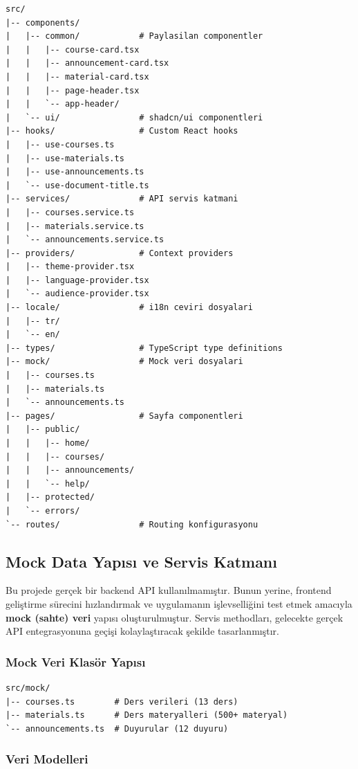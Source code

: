 \documentclass[12pt,a4paper]{article}
\begin{document}
\begin{lstlisting}[basicstyle=\ttfamily\small]
src/
|-- components/
|   |-- common/            # Paylasilan componentler
|   |   |-- course-card.tsx
|   |   |-- announcement-card.tsx
|   |   |-- material-card.tsx
|   |   |-- page-header.tsx
|   |   `-- app-header/
|   `-- ui/                # shadcn/ui componentleri
|-- hooks/                 # Custom React hooks
|   |-- use-courses.ts
|   |-- use-materials.ts
|   |-- use-announcements.ts
|   `-- use-document-title.ts
|-- services/              # API servis katmani
|   |-- courses.service.ts
|   |-- materials.service.ts
|   `-- announcements.service.ts
|-- providers/             # Context providers
|   |-- theme-provider.tsx
|   |-- language-provider.tsx
|   `-- audience-provider.tsx
|-- locale/                # i18n ceviri dosyalari
|   |-- tr/
|   `-- en/
|-- types/                 # TypeScript type definitions
|-- mock/                  # Mock veri dosyalari
|   |-- courses.ts
|   |-- materials.ts
|   `-- announcements.ts
|-- pages/                 # Sayfa componentleri
|   |-- public/
|   |   |-- home/
|   |   |-- courses/
|   |   |-- announcements/
|   |   `-- help/
|   |-- protected/
|   `-- errors/
`-- routes/                # Routing konfigurasyonu
\end{lstlisting}

\subsection{Mock Data Yapısı ve Servis Katmanı}

Bu projede gerçek bir backend API kullanılmamıştır. Bunun yerine, frontend geliştirme sürecini hızlandırmak ve uygulamanın işlevselliğini test etmek amacıyla \textbf{mock (sahte) veri} yapısı oluşturulmuştur. Servis methodları, gelecekte gerçek API entegrasyonuna geçişi kolaylaştıracak şekilde tasarlanmıştır.

\subsubsection{Mock Veri Klasör Yapısı}

\begin{lstlisting}[basicstyle=\ttfamily\small]
src/mock/
|-- courses.ts        # Ders verileri (13 ders)
|-- materials.ts      # Ders materyalleri (500+ materyal)
`-- announcements.ts  # Duyurular (12 duyuru)
\end{lstlisting}

\subsubsection{Veri Modelleri}
\end{document}
